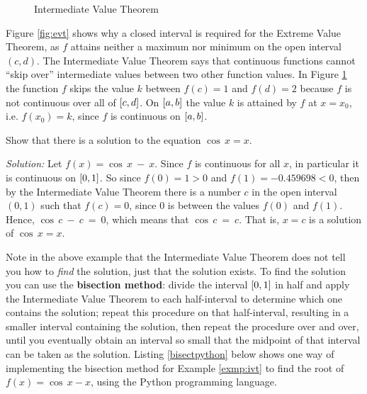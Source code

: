 \begin{figure}[ht]
\begin{minipage}[b]{8.5cm}
\begin{center}
\vspace{-5mm}
 \end{center}
 \caption[]{\quad Intermediate Value Theorem}
 \label{fig:ivt}
\end{minipage}
\end{figure}

\noindent Figure \ref{fig:evt} shows why a closed interval is required for the
Extreme Value Theorem, as $f$ attains neither a maximum nor minimum on the open
interval $(c,d)$. The Intermediate Value Theorem says that continuous functions
cannot ``skip over'' intermediate values between two other function values. In
Figure \ref{fig:ivt} the function $f$ skips the value $k$ between $f(c)=1$ and
$f(d)=2$ because $f$ is not continuous over all of $\lbrack c,d \rbrack$. On
$\lbrack a,b \rbrack$ the value $k$ is attained by $f$ at $x = x_0$, i.e. $f(x_0) = k$,
since $f$ is continuous on $\lbrack a,b \rbrack$.
\newpage
\begin{exmp}\label{exmp:ivt}
\noindent Show that there is a solution to the equation $\cos\,x = x$.\vspace{1mm}
\par\noindent\emph{Solution:} Let $f(x) = \cos\,x ~-~ x$. Since $f$ is
continuous for all $x$, in particular it is continuous on $\lbrack 0,1 \rbrack$. So
since $f(0) = 1 > 0$ and $f(1) = -0.459698 < 0$, then by the Intermediate Value
Theorem there is a number $c$ in the open interval $(0,1)$ such that $f(c) = 0$,
since $0$ is between the values $f(0)$ and $f(1)$. Hence, $\cos\,c ~-~ c ~=~ 0$,
which means that $\cos\,c ~=~ c$. That is, $x = c$ is a solution of
$\cos\,x = x$.\vspace{-2mm}
\end{exmp}
\divider
\vspace{2mm}

Note in the above example that the Intermediate Value Theorem does not tell you
how to \emph{find} the solution, just that the solution exists. To find the
solution you can use the \textbf{bisection method}: divide the interval
$\lbrack 0,1 \rbrack$ in half and apply the Intermediate Value Theorem to each
half-interval to determine which one contains the solution; repeat this
procedure on that half-interval, resulting in a smaller interval containing the
solution, then repeat the procedure over and over, until you eventually obtain
an interval so small that the midpoint of that interval can be taken as the
solution. Listing \ref{bisectpython} below shows one way of implementing the
bisection method for Example \ref{exmp:ivt} to find the root of
$f(x) = \cos\,x - x$, using the Python programming language.


